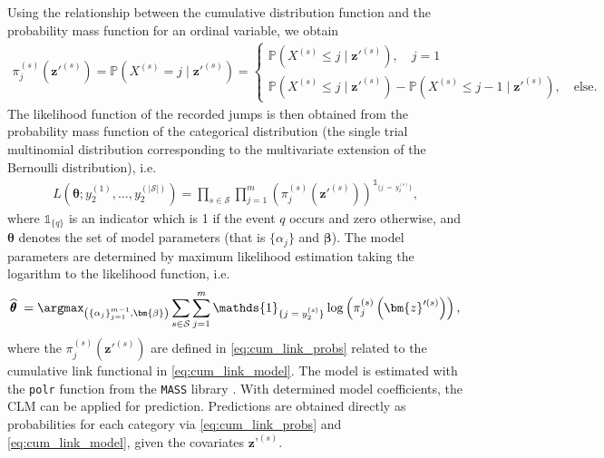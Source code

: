 Using the relationship between the cumulative distribution function and the probability mass function for an ordinal variable, we obtain
\begin{align}
     \pi^{(s)}_j\left(\bm{z}'^{(s)}\right) = 
     \mathds{P}\left( X^{(s)} = j \; \vert \; \bm{z}'^{(s)} \right) = 
    \begin{cases}
    \mathds{P}\left( X^{(s)} \leq j \; \vert \; \bm{z}'^{(s)} \right), \quad j = 1 \\
     \mathds{P}\left( X^{(s)} \leq j \; \vert \; \bm{z}'^{(s)} \right) - \mathds{P}\left( X^{(s)} \leq j -1 \; \vert \; \bm{z}'^{(s)} \right), \quad \text{else}.   
    \end{cases} \label{eq:cum_link_probs}
\end{align}
The likelihood function of the recorded jumps is then obtained from the probability mass function of the categorical distribution (the single trial multinomial distribution corresponding to the multivariate extension of the Bernoulli distribution), i.e.
\begin{equation*}
\begin{aligned}
     L\left( \bm{\theta}; y_2^{(1)}, \dots, y_2^{(|\mathcal{S}|)} \right) = \prod_{s \in \mathcal{S}} \prod_{j = 1}^m \left( \pi^{(s)}_j\left(\bm{z}'^{(s)}\right) \right)^{\mathds{1}_{ \{ j \; = \; y_2^{(s)}  \} }}, 
\end{aligned} \label{eq:likelihood_cumlink}
\end{equation*}
where $\mathds{1}_{ \{ q \} }$ is an indicator which is 1 if the event $q$ occurs and zero otherwise, and $\bm{\theta}$ denotes the set of model parameters (that is $\{\alpha_j\}$ and $\bm{\beta}$). The model parameters are determined by maximum likelihood estimation taking the logarithm to the likelihood function, i.e.
\begin{align*}
   \widehat{\pmb{\theta}}  \; = \argmax_{\left( \{ \alpha_{j} \}_{j = 1}^{m-1}, \bm{\beta} \right)} \sum_{s \in \mathcal{S}} \sum_{j = 1}^m 
   \mathds{1}_{ \{ j \; = \; y_2^{(s)} \} } \log\left( \pi^{(s)}_j\left(\bm{z}'^{(s)}\right) \right), 
\end{align*}
where the $\pi^{(s)}_j\left(\bm{z}'^{(s)}\right)$ are defined in \cref{eq:cum_link_probs} related to the cumulative link functional in \cref{eq:cum_link_model}.
The model is estimated with the \texttt{polr} function from the \texttt{MASS} library \citep{mass_R}.
With determined model coefficients, the CLM can be applied for prediction. 
Predictions are obtained directly as probabilities for each category via \cref{eq:cum_link_probs} and \cref{eq:cum_link_model}, given the covariates $\bm{z}’^{(s)}$.

